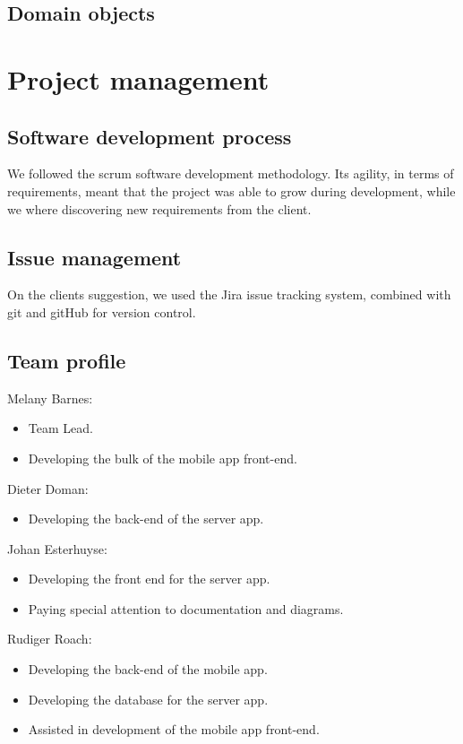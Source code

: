 \documentclass[10pt,a4paper]{article}
\begin{document}
\subsection{Domain objects}

\section{Project management}
\subsection{Software development process}
We followed the scrum software development methodology. Its agility, in terms of requirements, meant that the project was able to grow during development, while we where discovering new requirements from the client.
\subsection{Issue management}
On the clients suggestion, we used the Jira issue tracking system, combined with git and gitHub for version control.
\
\subsection{Team profile}
Melany Barnes:
\begin{itemize}
\item Team Lead.
\item Developing the bulk of the mobile app front-end.
\end{itemize}
Dieter Doman:
\begin{itemize}
\item Developing the back-end of the server app.
\end{itemize}
Johan Esterhuyse:
\begin{itemize}
\item Developing the front end for the server app.
\item Paying special attention to documentation and diagrams.
\end{itemize}
Rudiger Roach:
\begin{itemize}
\item Developing the back-end of the mobile app.
\item Developing the database for the server app.
\item Assisted in development of the mobile app front-end.
\end{itemize}
\end{document}
